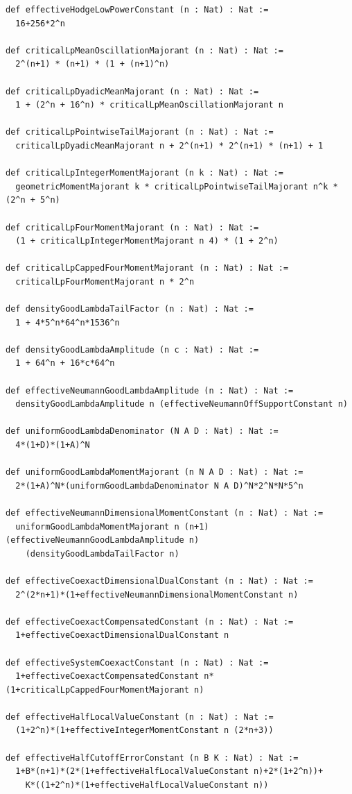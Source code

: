 \documentclass[11pt,a4paper]{article}
\numberwithin{equation}{section}
\theoremstyle{definition}
\theoremstyle{remark}
\begin{document}
\begin{lstlisting}
def effectiveHodgeLowPowerConstant (n : Nat) : Nat :=
  16+256*2^n

def criticalLpMeanOscillationMajorant (n : Nat) : Nat :=
  2^(n+1) * (n+1) * (1 + (n+1)^n)

def criticalLpDyadicMeanMajorant (n : Nat) : Nat :=
  1 + (2^n + 16^n) * criticalLpMeanOscillationMajorant n

def criticalLpPointwiseTailMajorant (n : Nat) : Nat :=
  criticalLpDyadicMeanMajorant n + 2^(n+1) * 2^(n+1) * (n+1) + 1

def criticalLpIntegerMomentMajorant (n k : Nat) : Nat :=
  geometricMomentMajorant k * criticalLpPointwiseTailMajorant n^k * (2^n + 5^n)

def criticalLpFourMomentMajorant (n : Nat) : Nat :=
  (1 + criticalLpIntegerMomentMajorant n 4) * (1 + 2^n)

def criticalLpCappedFourMomentMajorant (n : Nat) : Nat :=
  criticalLpFourMomentMajorant n * 2^n

def densityGoodLambdaTailFactor (n : Nat) : Nat :=
  1 + 4*5^n*64^n*1536^n

def densityGoodLambdaAmplitude (n c : Nat) : Nat :=
  1 + 64^n + 16*c*64^n

def effectiveNeumannGoodLambdaAmplitude (n : Nat) : Nat :=
  densityGoodLambdaAmplitude n (effectiveNeumannOffSupportConstant n)

def uniformGoodLambdaDenominator (N A D : Nat) : Nat :=
  4*(1+D)*(1+A)^N

def uniformGoodLambdaMomentMajorant (n N A D : Nat) : Nat :=
  2*(1+A)^N*(uniformGoodLambdaDenominator N A D)^N*2^N*N*5^n

def effectiveNeumannDimensionalMomentConstant (n : Nat) : Nat :=
  uniformGoodLambdaMomentMajorant n (n+1) (effectiveNeumannGoodLambdaAmplitude n)
    (densityGoodLambdaTailFactor n)

def effectiveCoexactDimensionalDualConstant (n : Nat) : Nat :=
  2^(2*n+1)*(1+effectiveNeumannDimensionalMomentConstant n)

def effectiveCoexactCompensatedConstant (n : Nat) : Nat :=
  1+effectiveCoexactDimensionalDualConstant n

def effectiveSystemCoexactConstant (n : Nat) : Nat :=
  1+effectiveCoexactCompensatedConstant n*(1+criticalLpCappedFourMomentMajorant n)

def effectiveHalfLocalValueConstant (n : Nat) : Nat :=
  (1+2^n)*(1+effectiveIntegerMomentConstant n (2*n+3))

def effectiveHalfCutoffErrorConstant (n B K : Nat) : Nat :=
  1+B*(n+1)*(2*(1+effectiveHalfLocalValueConstant n)+2*(1+2^n))+
    K*((1+2^n)*(1+effectiveHalfLocalValueConstant n))


\end{lstlisting}
\end{document}
